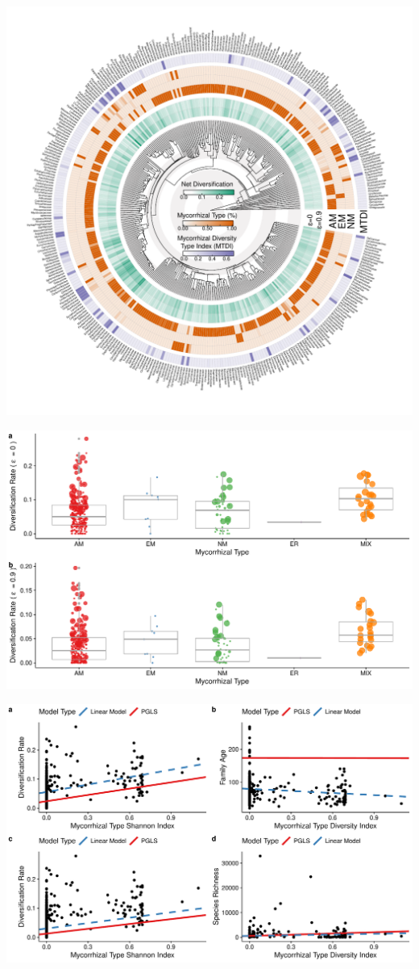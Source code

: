 \documentclass[12pt,]{article}
\begin{document}
\newpage

\includegraphics{../output/tree_fig/phylo_genus_final_resized.pdf}

\newpage

\includegraphics{../output/figs/boxplots_netdiv_myctype.pdf}

\newpage

\includegraphics{../output/figs/scatterplots_lm_pgls_stem.pdf}
\end{document}
